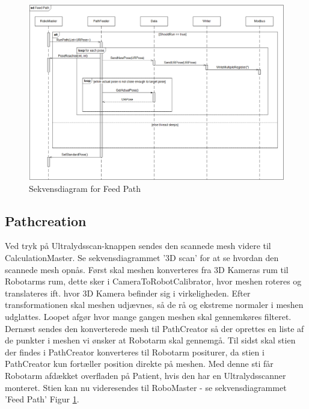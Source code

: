 \begin{figure}[H]
    \centering
    \includegraphics[width=1\textwidth] {figurer/d/Design/Sequence/sd_feedpath}
    \caption{Sekvensdiagram for Feed Path}
    \label{sd_feedpath}
\end{figure}

\subsection{Pathcreation}
Ved tryk på Ultralydsscan-knappen sendes den scannede mesh videre til CalculationMaster. Se sekvensdiagrammet '3D scan' for at se hvordan den scannede mesh opnås.
Først skal meshen konverteres fra 3D Kameras rum til Robotarms rum, dette sker i CameraToRobotCalibrator, hvor meshen roteres og translateres ift. hvor 3D Kamera befinder sig i virkeligheden.
Efter transformationen skal meshen udjævnes, så de rå og ekstreme normaler i meshen udglattes. Loopet afgør hvor mange gangen meshen skal gennemkøres filteret. Dernæst sendes den konverterede mesh til PathCreator så der oprettes en liste af de punkter i meshen vi ønsker at Robotarm skal gennemgå.
Til sidst skal stien der findes i PathCreator konverteres til Robotarm positurer, da stien i PathCreator kun fortæller position direkte på meshen. Med denne sti får Robotarm afdækket overfladen på Patient, hvis den har en Ultralydsscanner monteret.
Stien kan nu videresendes til RoboMaster - se sekvensdiagrammet 'Feed Path' Figur \ref{sd_feedpath}.


